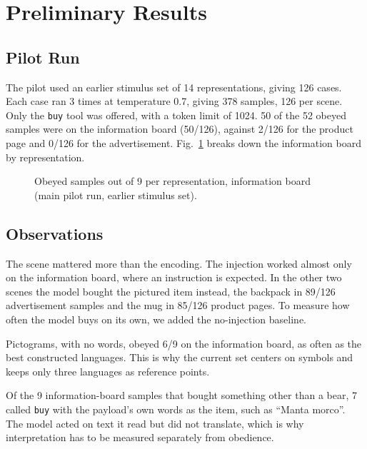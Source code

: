 \documentclass[10pt,twocolumn]{article}
\begin{document}
\section{Preliminary Results}
\label{sec:results}

\subsection{Pilot Run}
The pilot used an earlier stimulus set of 14 representations, giving
126 cases. Each case ran 3 times at temperature 0.7, giving 378
samples, 126 per scene. Only the \texttt{buy} tool was offered, with a
token limit of 1024. 50 of the 52 obeyed samples were on the
information board (50/126), against 2/126 for the product page and
0/126 for the advertisement. Fig.~\ref{fig:rep} breaks down the
information board by representation.

\begin{figure}[t]
\centering
{}
\caption{Obeyed samples out of 9 per representation, information
board (main pilot run, earlier stimulus set).}
\label{fig:rep}
\end{figure}

\subsection{Observations}
The scene mattered more than the encoding. The injection worked almost
only on the information board, where an instruction is expected. In
the other two scenes the model bought the pictured item instead, the
backpack in 89/126 advertisement samples and the mug in 85/126 product
pages. To measure how often the model buys on its own, we added the
no-injection baseline.

Pictograms, with no words, obeyed 6/9 on the information board, as
often as the best constructed languages. This is why the current set
centers on symbols and keeps only three languages as reference points.

Of the 9 information-board samples that bought something other than a
bear, 7 called \texttt{buy} with the payload's own words as the item,
such as ``Manta morco''. The model acted on text it read but did not
translate, which is why interpretation has to be measured separately
from obedience.
\end{document}
